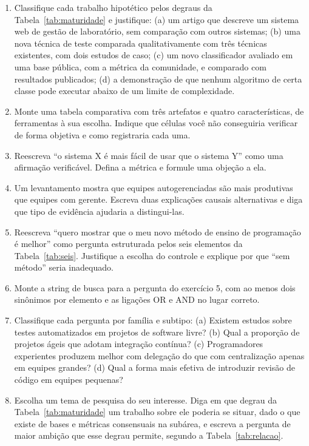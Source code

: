 \documentclass[10pt,a4paper]{extarticle}
\theoremstyle{definition}
\begin{document}
\begin{enumerate}[label=\textbf{\arabic*.}]
  \item Classifique cada trabalho hipotético pelos degraus da Tabela~\ref{tab:maturidade} e justifique: (a) um artigo que descreve um sistema web de gestão de laboratório, sem comparação com outros sistemas; (b) uma nova técnica de teste comparada qualitativamente com três técnicas existentes, com dois estudos de caso; (c) um novo classificador avaliado em uma base pública, com a métrica da comunidade, e comparado com resultados publicados; (d) a demonstração de que nenhum algoritmo de certa classe pode executar abaixo de um limite de complexidade.
  \item Monte uma tabela comparativa com três artefatos e quatro características, de ferramentas à sua escolha. Indique que células você não conseguiria verificar de forma objetiva e como registraria cada uma.
  \item Reescreva \enquote{o sistema X é mais fácil de usar que o sistema Y} como uma afirmação verificável. Defina a métrica e formule uma objeção a ela.
  \item Um levantamento mostra que equipes autogerenciadas são mais produtivas que equipes com gerente. Escreva duas explicações causais alternativas e diga que tipo de evidência ajudaria a distingui-las.
  \item Reescreva \enquote{quero mostrar que o meu novo método de ensino de programação é melhor} como pergunta estruturada pelos seis elementos da Tabela~\ref{tab:seis}. Justifique a escolha do controle e explique por que \enquote{sem método} seria inadequado.
  \item Monte a string de busca para a pergunta do exercício 5, com ao menos dois sinônimos por elemento e as ligações OR e AND no lugar correto.
  \item Classifique cada pergunta por família e subtipo: (a) Existem estudos sobre testes automatizados em projetos de software livre? (b) Qual a proporção de projetos ágeis que adotam integração contínua? (c) Programadores experientes produzem melhor com delegação do que com centralização apenas em equipes grandes? (d) Qual a forma mais efetiva de introduzir revisão de código em equipes pequenas?
  \item Escolha um tema de pesquisa do seu interesse. Diga em que degrau da Tabela~\ref{tab:maturidade} um trabalho sobre ele poderia se situar, dado o que existe de bases e métricas consensuais na subárea, e escreva a pergunta de maior ambição que esse degrau permite, segundo a Tabela~\ref{tab:relacao}.
\end{enumerate}
\end{document}

